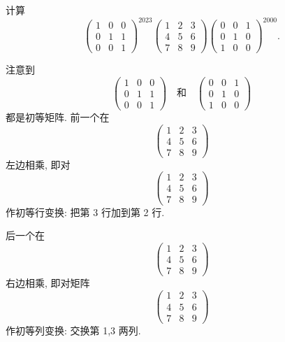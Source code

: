 \documentclass[../../main.tex]{subfiles}
\begin{document}
\begin{example}
计算
\[
\begin{pmatrix} 
1 & 0 & 0 \\
0 & 1 & 1 \\
0 & 0 & 1 
\end{pmatrix}^{2023} 
\begin{pmatrix} 
1 & 2 & 3 \\
4 & 5 & 6 \\
7 & 8 & 9 
\end{pmatrix} 
\begin{pmatrix} 
0 & 0 & 1 \\
0 & 1 & 0 \\
1 & 0 & 0 
\end{pmatrix}^{2000}.
\]
\end{example}
\begin{solution}
注意到
\[
\begin{pmatrix} 
1 & 0 & 0 \\
0 & 1 & 1 \\
0 & 0 & 1 
\end{pmatrix}
\quad \text{和} \quad
\begin{pmatrix} 
0 & 0 & 1 \\
0 & 1 & 0 \\
1 & 0 & 0 
\end{pmatrix}
\]
都是初等矩阵. 前一个在
\[
\begin{pmatrix} 
1 & 2 & 3 \\
4 & 5 & 6 \\
7 & 8 & 9 
\end{pmatrix}
\]
左边相乘, 即对
\[
\begin{pmatrix} 
1 & 2 & 3 \\
4 & 5 & 6 \\
7 & 8 & 9 
\end{pmatrix}
\]
作初等行变换: 把第 3 行加到第 2 行.

后一个在
\[
\begin{pmatrix} 
1 & 2 & 3 \\
4 & 5 & 6 \\
7 & 8 & 9 
\end{pmatrix}
\]
右边相乘, 即对矩阵
\[
\begin{pmatrix} 
1 & 2 & 3 \\
4 & 5 & 6 \\
7 & 8 & 9 
\end{pmatrix}
\]
作初等列变换: 交换第 1,3 两列.


\end{solution}
\end{document}
